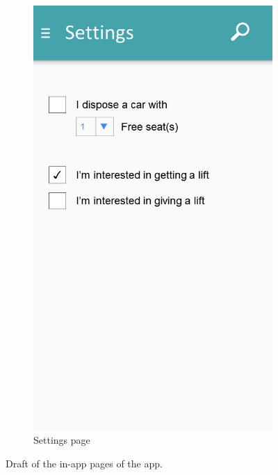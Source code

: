 \begin{figure}[h!]
\begin{subfigure}[b]{0.3\textwidth}
		\includegraphics[width=\textwidth]{figures/GUI-settings.png}
		\caption{Settings page}
		\label{fig:GUI-settings}
	\end{subfigure}
	\caption{Draft of the in-app pages of the app.}\label{fig:GUI-in-app}
\end{figure}


